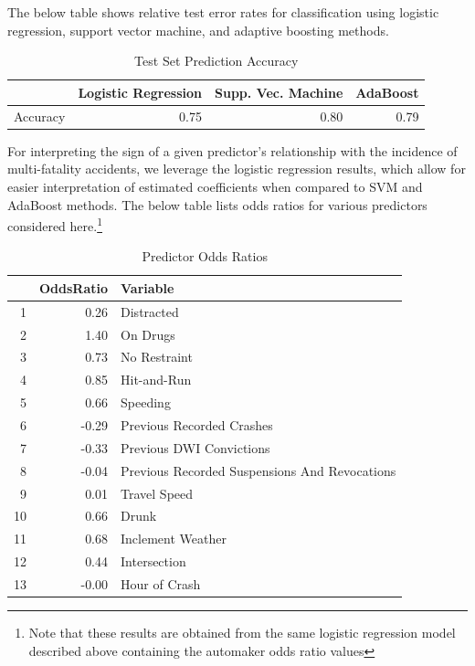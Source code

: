 \documentclass[11pt, oneside,titlepage]{article}   	%
\begin{document}
The below table shows relative test error rates for classification using logistic regression, support vector machine, and adaptive boosting methods. \\

\begin{table}[ht]
\centering
\begin{tabular}{rrrr}
  \hline
 & Logistic Regression & Supp. Vec. Machine & AdaBoost \\ 
  \hline
Accuracy & 0.75 & 0.80 & 0.79 \\ 
   \hline
\end{tabular}
\caption{Test Set Prediction Accuracy} 
\end{table}

For interpreting the sign of a given predictor's relationship with the incidence of multi-fatality accidents, we leverage the logistic regression results, which allow for easier interpretation of estimated coefficients when compared to SVM and AdaBoost methods. The below table lists odds ratios for various predictors considered here.\footnote{Note that these results are obtained from the same logistic regression model described above containing the automaker odds ratio values}

\begin{table}[ht]
\centering
\begin{tabular}{rrl}
  \hline
 & OddsRatio & Variable \\ 
  \hline
1 & 0.26 & Distracted \\ 
  2 & 1.40 & On Drugs \\ 
  3 & 0.73 & No Restraint \\ 
  4 & 0.85 & Hit-and-Run \\ 
  5 & 0.66 & Speeding \\ 
  6 & -0.29 & Previous Recorded Crashes \\ 
  7 & -0.33 & Previous DWI Convictions \\ 
  8 & -0.04 & Previous Recorded Suspensions And Revocations \\ 
  9 & 0.01 & Travel Speed \\ 
  10 & 0.66 & Drunk \\ 
  11 & 0.68 & Inclement Weather \\ 
  12 & 0.44 & Intersection \\ 
  13 & -0.00 & Hour of Crash \\ 
   \hline
\end{tabular}
\caption{Predictor Odds Ratios} 
\end{table}
\end{document}
